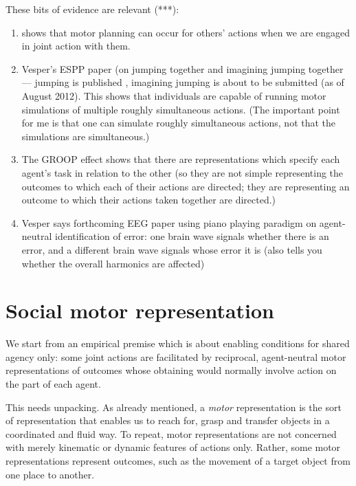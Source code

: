\documentclass[12pt,\papersize]{extarticle}
\begin{document}
These bits of evidence are relevant (***):
%
\begin{enumerate}

\item \citet{kourtis:2012_predictive} shows that motor planning can occur for others' actions when we are engaged in joint action with them.

\item Vesper's ESPP paper (on jumping together and imagining jumping together --- jumping is published \citep{vesper:2012_jumping}, imagining jumping is about to be submitted (as of August 2012).  This shows that individuals are capable of running motor simulations of multiple roughly simultaneous actions. 
(The important point for me is that one can simulate roughly simultaneous actions, not that the simulations are simultaneous.)

\item The GROOP effect shows that there are representations which specify each agent's task in relation to the other (so they are not simple representing the outcomes to which each of their actions are directed; they are representing an outcome to which their actions taken together are directed.)

\item Vesper says forthcoming EEG paper using piano playing paradigm on agent-neutral identification of error: one brain wave signals whether there is an error, and a different brain wave signals whose error it is (also tells you whether the overall harmonics are affected)
\end{enumerate}

\section{Social motor representation}
We start from an empirical premise which is about enabling conditions for shared agency only: some joint actions are facilitated by reciprocal, agent-neutral motor representations of outcomes whose obtaining would normally involve action on the part of each agent.

This needs unpacking. 
As already mentioned, a \textit{motor} representation is the sort of representation that enables us to reach for, grasp and transfer objects in a coordinated and fluid way.
To repeat, motor representations are not concerned with merely kinematic or dynamic features of actions only.
Rather, some motor representations represent outcomes, such as the movement of a target object from one place to another.
\end{document}
